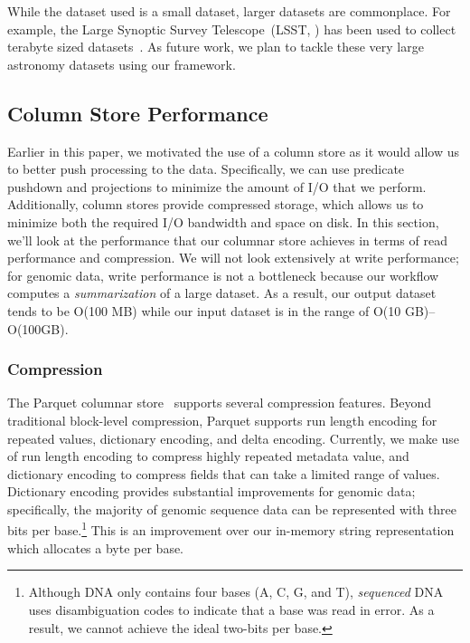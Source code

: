 \documentclass[10pt]{report} %
\begin{document}
While the dataset used is a small dataset, larger datasets are commonplace. For example, the Large Synoptic
Survey Telescope~(LSST, \cite{lsst2008}) has been used to collect terabyte sized datasets~\cite{moyers13}. As
future work, we plan to tackle these very large astronomy datasets using our framework.

\subsection{Column Store Performance}
\label{sec:column-store-perf}

Earlier in this paper, we motivated the use of a column store as it would allow us to better push processing to
the data. Specifically, we can use predicate pushdown and projections to minimize the amount of I/O that we
perform. Additionally, column stores provide compressed storage, which allows us to minimize both the required
I/O bandwidth and space on disk. In this section, we'll look at the performance that our columnar store achieves
in terms of read performance and compression. We will not look extensively at write performance; for genomic
data, write performance is not a bottleneck because our workflow computes a \emph{summarization} of a large
dataset. As a result, our output dataset tends to be O(100 MB) while our input dataset is in the range of
O(10 GB)--O(100GB).

\pagebreak

\subsubsection{Compression}
\label{sec:compression}

The Parquet columnar store~\cite{parquet} supports several compression features. Beyond traditional block-level
compression, Parquet supports run length encoding for repeated values, dictionary encoding, and delta
encoding. Currently, we make use of run length encoding to compress highly repeated metadata value,
and dictionary encoding to compress fields that can take a limited range of values. Dictionary encoding provides
substantial improvements for genomic data; specifically, the majority of genomic sequence data can be
represented with three bits per base.\footnote{Although DNA only contains four bases (A, C, G, and T),
\emph{sequenced} DNA uses disambiguation codes to indicate that a base was read in error. As a result, we
cannot achieve the ideal two-bits per base.} This is an improvement over our in-memory string representation
which allocates a byte per base.
\end{document}
